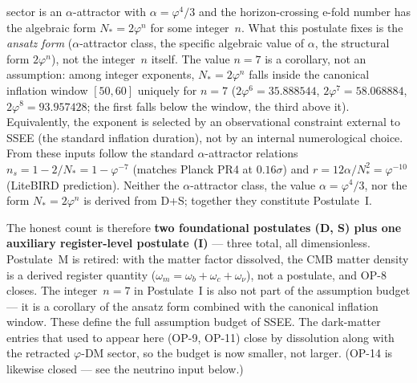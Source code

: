 \documentclass[12pt,a4paper]{article}
\begin{document}
\begin{itemize}
        sector is an $\alpha$-attractor with $\alpha=\varphi^4/3$ and the
        horizon-crossing e-fold number has the algebraic form
        $N_*=2\varphi^n$ for some integer~$n$. What this postulate fixes
        is the \emph{ansatz form} ($\alpha$-attractor class, the specific
        algebraic value of $\alpha$, the structural form $2\varphi^n$),
        not the integer~$n$ itself. The value $n=7$ is a corollary, not an
        assumption: among integer exponents, $N_*=2\varphi^n$ falls inside
        the canonical inflation window $[50,60]$ uniquely for $n=7$
        ($2\varphi^6=35.888544$, $2\varphi^7=58.068884$,
        $2\varphi^8=93.957428$; the first falls below the window, the third
        above it).
        Equivalently, the exponent is selected by an observational
        constraint external to SSEE (the standard inflation duration),
        not by an internal numerological choice. From these inputs follow
        the standard $\alpha$-attractor relations
        $n_s=1-2/N_*=1-\varphi^{-7}$ (matches Planck PR4 at $0.16\sigma$)
        and $r=12\alpha/N_*^2 = \varphi^{-10}$ (LiteBIRD prediction).
        Neither the $\alpha$-attractor class, the value $\alpha=\varphi^4/3$,
        nor the form $N_*=2\varphi^n$ is derived from D+S; together they
        constitute Postulate~I.
\end{itemize}
The honest count is therefore \textbf{two foundational postulates (D, S)
plus one auxiliary register-level postulate (I)} --- three total, all
dimensionless. Postulate~M is retired: with the matter factor dissolved, the
CMB matter density is a derived register quantity ($\omega_m=\omega_b+\omega_c
+\omega_\nu$), not a postulate, and OP-8 closes. The integer~$n=7$ in
Postulate~I is also not part of the assumption budget --- it is a corollary
of the ansatz form combined with the canonical inflation window. These define the full assumption budget of SSEE. The dark-matter entries that used to
appear here (OP-9, OP-11) close by dissolution along with the retracted
$\varphi$-DM sector, so the budget is now smaller, not larger. (OP-14 is likewise closed --- see the neutrino input below.)
\end{document}
